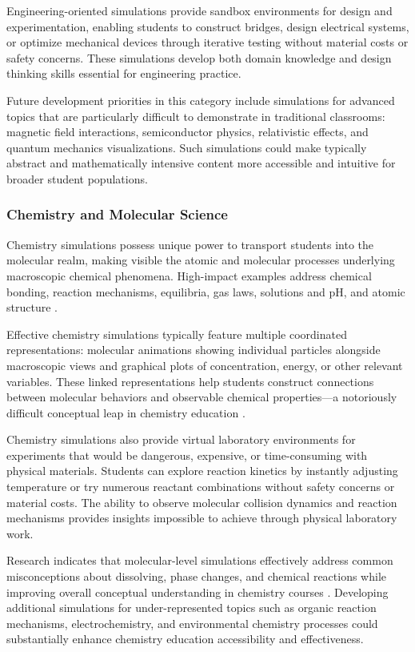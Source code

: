 Engineering-oriented simulations provide sandbox environments for design and experimentation, enabling students to construct bridges, design electrical systems, or optimize mechanical devices through iterative testing without material costs or safety concerns. These simulations develop both domain knowledge and design thinking skills essential for engineering practice.

Future development priorities in this category include simulations for advanced topics that are particularly difficult to demonstrate in traditional classrooms: magnetic field interactions, semiconductor physics, relativistic effects, and quantum mechanics visualizations. Such simulations could make typically abstract and mathematically intensive content more accessible and intuitive for broader student populations.

\subsubsection{Chemistry and Molecular Science}

Chemistry simulations possess unique power to transport students into the molecular realm, making visible the atomic and molecular processes underlying macroscopic chemical phenomena. High-impact examples address chemical bonding, reaction mechanisms, equilibria, gas laws, solutions and pH, and atomic structure \cite{phet2023}.

Effective chemistry simulations typically feature multiple coordinated representations: molecular animations showing individual particles alongside macroscopic views and graphical plots of concentration, energy, or other relevant variables. These linked representations help students construct connections between molecular behaviors and observable chemical properties---a notoriously difficult conceptual leap in chemistry education \cite{phet2023}.

Chemistry simulations also provide virtual laboratory environments for experiments that would be dangerous, expensive, or time-consuming with physical materials. Students can explore reaction kinetics by instantly adjusting temperature or try numerous reactant combinations without safety concerns or material costs. The ability to observe molecular collision dynamics and reaction mechanisms provides insights impossible to achieve through physical laboratory work.

Research indicates that molecular-level simulations effectively address common misconceptions about dissolving, phase changes, and chemical reactions while improving overall conceptual understanding in chemistry courses \cite{mdpi2024}. Developing additional simulations for under-represented topics such as organic reaction mechanisms, electrochemistry, and environmental chemistry processes could substantially enhance chemistry education accessibility and effectiveness.

